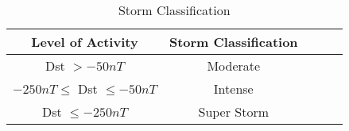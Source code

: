 	\begin{table}[h]
		\centering
		\caption{Storm Classification}
		\label{table:stormclass}
		\begin{tabular}{ccccc}
		\hline
		Level of Activity & Storm Classification \\ \hline
		Dst $> -50 nT$ & Moderate\\
		$-250 nT \leq $ Dst $\leq -50 nT$ & Intense\\
		Dst $\leq -250 nT$ & Super Storm\\ \hline
		\end{tabular}
	\end{table}



